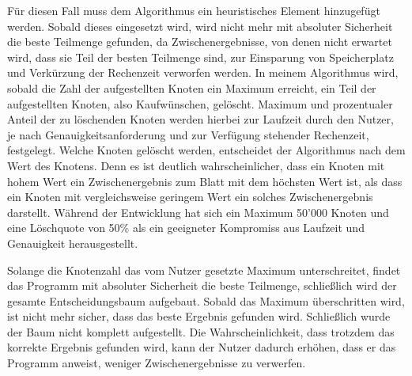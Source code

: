 Für diesen Fall muss dem Algorithmus ein heuristisches Element hinzugefügt werden. Sobald dieses eingesetzt wird, wird nicht mehr mit absoluter Sicherheit die beste Teilmenge gefunden, da Zwischenergebnisse, von denen nicht erwartet wird, dass sie Teil der besten Teilmenge sind, zur Einsparung von Speicherplatz und Verkürzung der Rechenzeit verworfen werden.
In meinem Algorithmus wird, sobald die Zahl der aufgestellten Knoten ein Maximum erreicht, ein Teil der aufgestellten Knoten, also Kaufwünschen, gelöscht. Maximum und prozentualer Anteil der zu löschenden Knoten werden hierbei zur Laufzeit durch den Nutzer, je nach Genauigkeitsanforderung und zur Verfügung stehender Rechenzeit, festgelegt. Welche Knoten gelöscht werden, entscheidet der Algorithmus nach dem Wert des Knotens. Denn es ist deutlich wahrscheinlicher, dass ein Knoten mit hohem Wert ein Zwischenergebnis zum Blatt mit dem höchsten Wert ist, als dass ein Knoten mit vergleichsweise geringem Wert ein solches Zwischenergebnis darstellt. Während der Entwicklung hat sich ein Maximum 50'000 Knoten und eine Löschquote von 50\% als ein geeigneter Kompromiss aus Laufzeit und Genauigkeit herausgestellt.

Solange die Knotenzahl das vom Nutzer gesetzte Maximum unterschreitet, findet das Programm mit absoluter Sicherheit die beste Teilmenge, schließlich wird der gesamte Entscheidungsbaum aufgebaut. Sobald das Maximum überschritten wird, ist nicht mehr sicher, dass das beste Ergebnis gefunden wird. Schließlich wurde der Baum nicht komplett aufgestellt. Die Wahrscheinlichkeit, dass trotzdem das korrekte Ergebnis gefunden wird, kann der Nutzer dadurch erhöhen, dass er das Programm anweist, weniger Zwischenergebnisse zu verwerfen.
